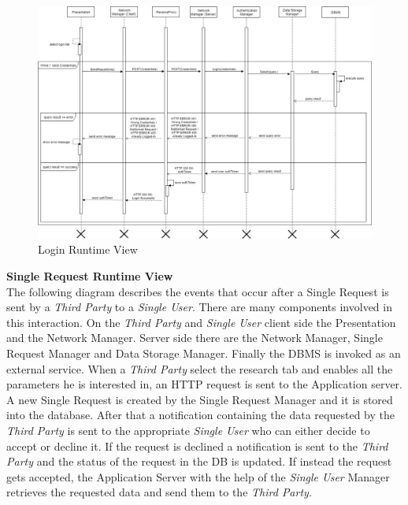 \documentclass[titlepage]{article}
\begin{document}
\begin{figure}[H]
	\center
  	\includegraphics[width=15cm]{Login.png}
  	\caption{Login Runtime View}
 	\label{fig:LOG}
\end{figure}
\noindent
{\bf Single Request Runtime View }\\ 
The following diagram describes the events that occur after a Single Request is sent by a {\it Third Party} to a {\it Single User}. There are many components involved in this interaction. On the {\it Third Party} and {\it Single User} client side the Presentation and the Network Manager. Server side there are the Network Manager, Single Request Manager and Data Storage Manager. Finally the DBMS is invoked as an external service.
When a {\it Third Party} select the research tab and enables all the parameters he is interested in, an HTTP request is sent to the Application server. A new Single Request is created by the Single Request Manager and it is stored into the database. After that a notification containing the data requested by the {\it Third Party} is sent to the appropriate {\it Single User} who can either decide to accept or decline it. If the request is declined a notification is sent to the {\it Third Party} and the status of the request in the DB is updated. If instead the request gets accepted, the Application Server with the help of the {\it Single User} Manager retrieves the requested data and send them to the {\it Third Party}.
\end{document}
